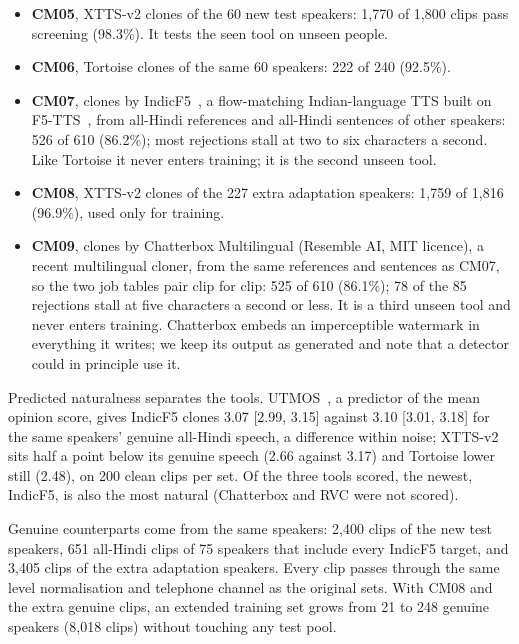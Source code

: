 \begin{itemize}
  \item \textbf{CM05}, XTTS-v2 clones of the 60 new test speakers: 1{,}770 of 1{,}800
    clips pass screening (98.3\%). It tests the seen tool on unseen people.
  \item \textbf{CM06}, Tortoise clones of the same 60 speakers: 222 of 240 (92.5\%).
  \item \textbf{CM07}, clones by IndicF5~\cite{ai4bharat2025indicf5}, a flow-matching
    Indian-language TTS built on F5-TTS~\cite{chen2024f5tts}, from all-Hindi references
    and all-Hindi sentences of other speakers: 526 of 610 (86.2\%); most rejections
    stall at two to six characters a second. Like Tortoise it never enters training;
    it is the second unseen tool.
  \item \textbf{CM08}, XTTS-v2 clones of the 227 extra adaptation speakers: 1{,}759 of
    1{,}816 (96.9\%), used only for training.
  \item \textbf{CM09}, clones by Chatterbox Multilingual (Resemble AI, MIT licence), a
    recent multilingual cloner, from the same references and sentences as CM07, so the
    two job tables pair clip for clip: 525 of 610 (86.1\%); 78 of the 85 rejections stall at
    five characters a second or less. It is a third unseen tool and never enters
    training. Chatterbox embeds an imperceptible watermark in everything it writes; we
    keep its output as generated and note that a detector could in principle use it.
\end{itemize}

Predicted naturalness separates the tools. UTMOS~\cite{saeki2022utmos}, a predictor of
the mean opinion score, gives IndicF5 clones 3.07 [2.99, 3.15] against 3.10 [3.01, 3.18]
for the same speakers' genuine all-Hindi speech, a difference within noise; XTTS-v2 sits
half a point below its genuine speech (2.66 against 3.17) and Tortoise lower still
(2.48), on 200 clean clips per set. Of the three tools scored, the newest, IndicF5, is
also the most natural (Chatterbox and RVC were not scored).

Genuine counterparts come from the same speakers: 2{,}400 clips of the new test
speakers, 651 all-Hindi clips of 75 speakers that include every IndicF5 target, and 3{,}405 clips of the extra
adaptation speakers. Every clip passes through the same level normalisation and
telephone channel as the original sets. With CM08 and the extra genuine clips, an
extended training set grows from 21 to 248 genuine speakers (8{,}018 clips) without
touching any test pool.

